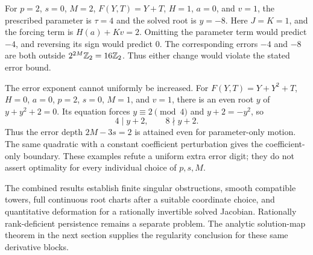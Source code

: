 \begin{example}\label{ex:motion-boundary}
For $p=2$, $s=0$, $M=2$, $F(Y,T)=Y+T$, $H=1$, $a=0$, and $v=1$,
the prescribed parameter is $\tau=4$ and the solved root is $y=-8$.
Here $J=K=1$, and the forcing term is $H(a)+Kv=2$. Omitting the parameter
term would predict $-4$, and reversing its sign would predict $0$.
The corresponding errors $-4$ and $-8$ are both outside
$2^{2M}\mathbb Z_2=16\mathbb Z_2$. Thus either change would violate the stated error
bound.

The error exponent cannot uniformly be increased. For
$F(Y,T)=Y+Y^2+T$, $H=0$, $a=0$, $p=2$, $s=0$, $M=1$, and $v=1$,
there is an even root $y$ of $y+y^2+2=0$. Its equation forces
$y\equiv2\pmod4$ and $y+2=-y^2$, so
\[
 4\mid y+2,\qquad 8\nmid y+2.
\]
Thus the error depth $2M-3s=2$ is attained even for parameter-only motion.
The same quadratic with a constant coefficient perturbation gives the
coefficient-only boundary. These examples refute a uniform extra error
digit; they do not assert optimality for every individual choice of
$p,s,M$.
\end{example}

The combined results establish finite singular obstructions, smooth
compatible towers, full continuous root charts after a suitable coordinate
choice, and quantitative deformation for a rationally invertible solved
Jacobian. Rationally rank-deficient persistence remains a separate problem.
The analytic solution-map theorem in the next section supplies the
regularity conclusion for these same derivative blocks.
